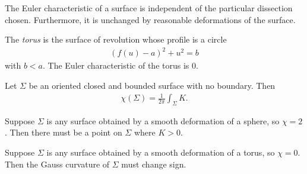 \documentclass{article}
\begin{document}
\begin{proposition}[Notes 15.8]
	The Euler characteristic of a surface is independent of the particular dissection chosen.
	Furthermore, it is unchanged by reasonable deformations of the surface.
\end{proposition}

\begin{definition}
	The \emph{torus} is the surface of revolution whose profile is a circle
	\begin{align*}
		(f(u)-a)^2 + u^2 = b
	\end{align*}
	with $b<a$. The Euler characteristic of the torus is $0$.
\end{definition}

\begin{theorem}
	Let $\Sigma$ be an oriented closed and bounded surface with no boundary. Then
	\begin{align*}
		\chi(\Sigma) = \frac{1}{2\pi}\int_\Sigma K.
	\end{align*}
\end{theorem}

\begin{corollary}[Notes 15.15]
	Suppose $\Sigma$ is any surface obtained by a smooth deformation of a sphere,
	so $\chi=2$. Then there must be a point on $\Sigma$ where $K>0$.
\end{corollary}

\begin{corollary}[Notes 15.16]
	Suppose $\Sigma$ is any surface obtained by a smooth deformation of a torus,
	so $\chi=0$. Then the Gauss curvature of $\Sigma$ must change sign.
\end{corollary}
\end{document}
